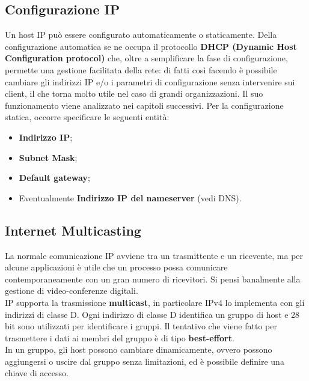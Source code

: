     \subsection{Configurazione IP}
        Un host IP può essere configurato automaticamente o staticamente. Della configurazione
        automatica se ne occupa il protocollo \textbf{DHCP (Dynamic Host Configuration protocol)} che,
        oltre a semplificare la fase di configurazione, permette una gestione facilitata della rete: di fatti
        così facendo è possibile cambiare gli indirizzi IP e/o i parametri di configurazione senza
        intervenire sui client, il che torna molto utile nel caso di grandi organizzazioni. Il suo
        funzionamento viene analizzato nei capitoli successivi.
        Per la configurazione statica, occorre specificare le seguenti entità:

        \begin{itemize}
            \item \textbf{Indirizzo IP};
            \item \textbf{Subnet Mask};
            \item \textbf{Default gateway};
            \item Eventualmente \textbf{Indirizzo IP del nameserver} (vedi DNS).
        \end{itemize}       

    \subsection{Internet Multicasting}
        La normale comunicazione IP avviene tra un trasmittente e un ricevente, ma per alcune
        applicazioni è utile che un processo possa comunicare contemporaneamente con un gran
        numero di ricevitori. Si pensi banalmente alla gestione di video-conferenze digitali.\\
        
        IP supporta la trasmissione \textbf{multicast}, in particolare IPv4 lo implementa con gli indirizzi di
        classe D. Ogni indirizzo di classe D identifica un gruppo di host e 28 bit sono utilizzati per
        identificare i gruppi. Il tentativo che viene fatto per trasmettere i dati ai membri del gruppo è
        di tipo \textbf{best-effort}.\\
        
        In un gruppo, gli host possono cambiare dinamicamente, ovvero possono aggiungersi o uscire
        dal gruppo senza limitazioni, ed è possibile definire una chiave di accesso.\\


